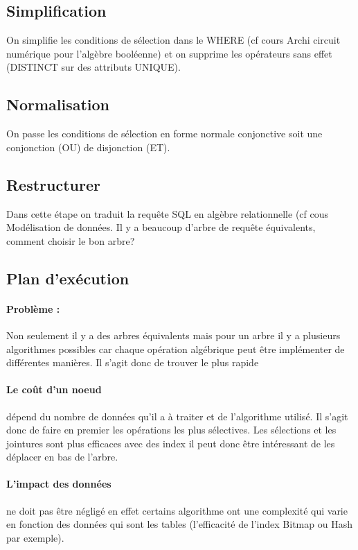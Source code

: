 \documentclass[10pt,a4paper,twoside]{article}
\begin{document}
\subsection{Simplification}
On simplifie les conditions de sélection dans le WHERE (cf cours Archi circuit numérique pour l'algèbre booléenne) et on supprime les opérateurs sans effet (DISTINCT sur des attributs UNIQUE).

\subsection{Normalisation}
On passe les conditions de sélection en forme normale conjonctive soit une conjonction (OU) de disjonction (ET). 

\subsection{Restructurer}
Dans cette étape on traduit la requête SQL en algèbre relationnelle (cf cous Modélisation de données. Il y a beaucoup d'arbre de requête équivalents, comment choisir le bon arbre? 

\subsection{Plan d'exécution}
\paragraph{Problème :} Non seulement il y a des arbres équivalents mais pour un arbre il y a plusieurs algorithmes possibles car chaque opération algébrique peut être implémenter de différentes manières. Il s'agit donc de trouver le plus rapide

\paragraph{Le coût d'un noeud} dépend du nombre de données qu'il a à traiter et de l'algorithme utilisé. Il s'agit donc de faire en premier les opérations les plus sélectives. Les sélections et les jointures sont plus efficaces avec des index il peut donc être intéressant de les déplacer en bas de l'arbre.

\paragraph{L'impact des données} ne doit pas être négligé en effet certains algorithme ont une complexité qui varie en fonction des données qui sont les tables (l'efficacité de l'index Bitmap ou Hash par exemple).
\end{document}
